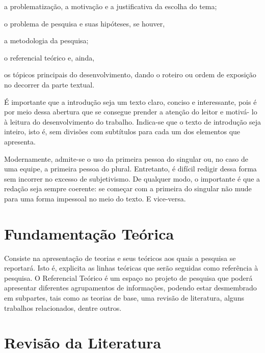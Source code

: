 \documentclass[12pt,oneside,a4paper,chapter=TITLE,section=TITLE,sumario
=tradicional]{abntex2}
\begin{document}
\begin{lista}
    \item a problematização, a motivação e a justificativa da escolha do tema;
    \item o problema de pesquisa e suas hipóteses, se houver,
    \item a metodologia da pesquisa;
    \item o referencial teórico e, ainda,
    \item os tópicos principais do desenvolvimento, dando o roteiro ou
    ordem de exposição no decorrer da parte textual.
\end{lista}

É importante que a introdução seja um texto claro, conciso e interessante, pois 
é por meio dessa abertura que se consegue prender a atenção do leitor e motivá- 
lo à leitura do desenvolvimento do trabalho. Indica-se que o texto de 
introdução seja inteiro, isto é, sem divisões com subtítulos para cada um dos 
elementos que apresenta.

Modernamente, admite-se o uso da primeira pessoa do singular ou, no caso de uma 
equipe, a primeira pessoa do plural. Entretanto, é difícil redigir dessa forma 
sem incorrer no excesso de subjetivismo. De qualquer modo, o importante é que a 
redação seja sempre coerente: se começar com a primeira do singular não mude 
para uma forma impessoal no meio do texto. E vice-versa.

\chapter{Fundamentação Teórica}
\label{cap:fundamentacao-teorica}

Consiste na apresentação de teorias e seus teóricos aos quais a pesquisa se 
reportará. Isto é, explicita as linhas teóricas que serão seguidas como 
referência à pesquisa. O Referencial Teórico é um espaço no projeto de pesquisa 
que poderá apresentar diferentes agrupamentos de informações, podendo estar 
desmembrado em subpartes, tais como as teorias de base, uma revisão de 
literatura, alguns trabalhos relacionados, dentre outros.

\chapter{Revisão da Literatura}
\label{cap:revisao-literatura}
\end{document}
